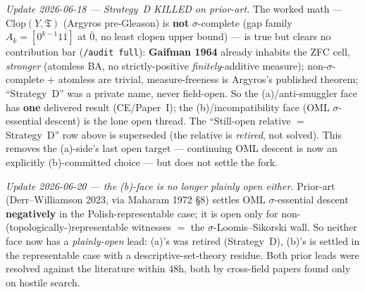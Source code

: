 \documentclass[11pt]{article}
\begin{document}
\bigskip
\noindent\emph{Update 2026-06-18 --- Strategy~D KILLED on prior-art.} The worked
math --- $\mathrm{Clop}(Y,\mathfrak{T})$ (Argyros pre-Gleason) is \textbf{not}
$\sigma$-complete (gap family $A_k=[0^{k-1}11]$ at $\bar 0$, no least clopen upper
bound) --- is true but clears no contribution bar (\texttt{/audit full}):
\textbf{Gaifman 1964} already inhabits the ZFC cell, \emph{stronger} (atomless BA, no
strictly-positive \emph{finitely}-additive measure); non-$\sigma$-complete $+$
atomless are trivial, measure-freeness is Argyros's published theorem; ``Strategy~D''
was a private name, never field-open. So the (a)/anti-smuggler face has \textbf{one}
delivered result (CE/Paper~I); the (b)/incompatibility face (OML $\sigma$-essential
descent) is the lone open thread. The ``Still-open relative $=$ Strategy~D'' row above
is superseded (the relative is \emph{retired}, not solved). This removes the (a)-side's
last open target --- continuing OML descent is now an explicitly (b)-committed choice
--- but does not settle the fork.

\bigskip
\noindent\emph{Update 2026-06-20 --- the (b)-face is no longer plainly open either.}
Prior-art (Derr--Williamson 2023, via Maharam 1972 \S8) settles OML $\sigma$-essential
descent \textbf{negatively} in the Polish-representable case; it is open only for
non-(topologically-)representable witnesses $=$ the $\sigma$-Loomis--Sikorski wall.
So neither face now has a \emph{plainly-open} lead: (a)'s was retired (Strategy~D),
(b)'s is settled in the representable case with a descriptive-set-theory residue.
Both prior leads were resolved against the literature within $48$h, both by
cross-field papers found only on hostile search.
\end{document}

